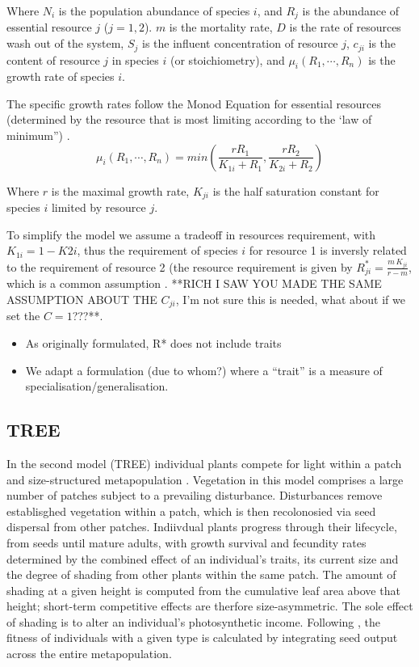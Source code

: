 \documentclass[a4paper,11pt]{article}
\begin{document}
Where $N_i$ is the population abundance of species $i$, and $R_j$ is the
abundance of essential resource $j$ ($j = 1, 2$). $m$ is the
mortality rate, $D$ is the rate of resources wash out of the system,
$S_j$ is the influent concentration of resource $j$, $c_{ji}$ is the
content of resource $j$ in species $i$ (or stoichiometry), and
$\mu_i(R_1, \cdots,  R_n)$ is the growth rate of species $i$.

The specific growth rates follow the Monod Equation for essential
resources (determined by the resource that is most limiting according
to the ‘law of minimum”)  \citep{Tilman-1977,Huisman-1999}.
\begin{equation}
\label{eq:R1}
\mu_i(R_1, \cdots,  R_n) = min \left( \frac{r R_1}{K_{1i} + R_1},  \frac{r R_2}{K_{2i} + R_2} \right)
\end{equation}

Where $r$ is the maximal growth rate, $K_{ji}$ is the
half saturation constant for species $i$ limited by resource $j$.

To simplify the model we assume a tradeoff in resources requirement, with $K_{1i} = 1-K{2i}$, thus the
requirement of species $i$ for resource 1 is inversly related to the
requirement of resource 2 (the resource requirement is given by
$R_{ji}^*=\frac{m \, K_{ji}}{r-m}$, which is a common assumption
\citep{Tilman-1985,Schreiber-2003,Fox-2008}. **RICH I SAW YOU MADE THE
SAME ASSUMPTION ABOUT THE $C_{ji}$, I'm not sure this is needed, what
about if we set the $C=1$???**.


\begin{itemize}
\item As originally formulated, R* does not include traits
\item We adapt a formulation (due to whom?) where a ``trait'' is a
  measure of specialisation/generalisation.
\end{itemize}

\subsection{TREE}

In the second model (TREE) individual plants compete for light within a patch
and size-structured metapopulation \citet{Falster-2011, Falster-2015}.
Vegetation in this model comprises a large number of patches subject to a
prevailing disturbance. Disturbances remove establisghed vegetation within a
patch, which is then recolonosied via seed dispersal from other patches.
Indiivdual plants progress through their lifecycle, from seeds until mature
adults, with growth survival and fecundity rates determined by the combined
effect of an individual's traits, its current size and the degree of shading
from other plants within the same patch. The amount of shading at a given
height is computed from the cumulative leaf area above that height; short-term
competitive effects are therfore size-asymmetric. The sole effect of shading
is to alter an individual's photosynthetic income. Following
\citep{Falster-2015}, the fitness of individuals with a given type is
calculated by integrating seed output across the entire metapopulation.
\end{document}
